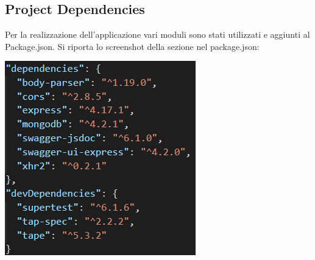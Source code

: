 \documentclass{article}
\begin{document}
   \subsection{Project Dependencies}
   Per la realizzazione dell’applicazione vari moduli sono stati utilizzati e aggiunti al Package.json. Si riporta lo screenshot della sezione nel package.json:\\
   \begin{center}
      \includegraphics[scale=0.5]{dipendenze.png}
   \end{center}
\end{document}
